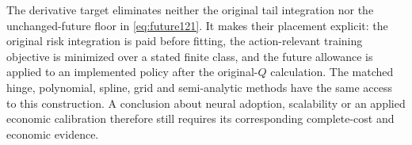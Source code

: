 The derivative target eliminates neither
the original tail integration nor the
unchanged-future floor in
\eqref{eq:future121}.
It makes their placement explicit:
the original risk integration is paid
before fitting, the action-relevant
training objective is minimized over
a stated finite class, and the future
allowance is applied to an implemented
policy after the original-\(Q\) calculation.
The matched hinge, polynomial, spline,
grid and semi-analytic methods have
the same access to this construction.
A conclusion about neural adoption,
scalability or an applied economic
calibration therefore still requires
its corresponding complete-cost and
economic evidence.
